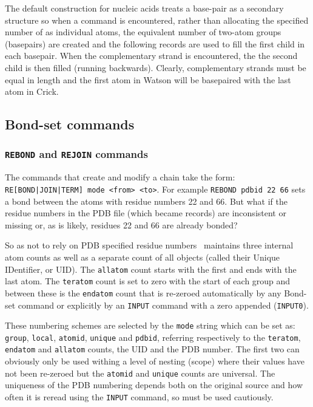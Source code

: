 The default construction for nucleic acids treats a base-pair as a secondary structure so when
a  command is encountered, rather than allocating the specified number of 
as individual atoms, the equivalent number of two-atom groups (basepairs) are created and the
following  records are used to fill the first child in each basepair.   When the 
complementary strand is encountered, the the second child is then filled (running backwards).
Clearly, complementary strands must be equal in length and the first atom in Watson will be
basepaired with the last atom in Crick. 


\subsection{Bond-set commands}

\subsubsection{{\tt REBOND} and {\tt REJOIN} commands}

The commands that create and modify a chain take the form: {\tt RE[BOND|JOIN|TERM] mode <from> <to>}.
For example {\tt REBOND pdbid 22 66} sets a bond between the atoms with residue numbers 22 and 66.
But what if the residue numbers in the PDB file (which became  records) are inconsistent or
missing or, as is likely, residues 22 and 66 are already bonded?

So as not to rely on PDB specified residue numbers \NAME\ maintains three internal atom counts as
well as a separate count of all objects (called their Unique IDentifier, or UID).  The {\tt allatom}
count starts with the first and ends with the last atom.  The {\tt teratom} count is set to zero with the
start of each group and between these is the {\tt endatom} count that is re-zeroed automatically by
any Bond-set command or explicitly by an {\tt INPUT} command with a zero appended ({\tt INPUT0}).

These numbering schemes are selected by the {\tt mode} string which can be set as: {\tt group}, {\tt local},
{\tt atomid}, {\tt unique} and {\tt pdbid}, referring respectively to the  {\tt teratom},  {\tt endatom}
and  {\tt allatom} counts, the UID and the PDB number.   The first two can obviously only be used
withing a level of nesting (scope) where their values have not been re-zeroed but the {\tt atomid} and
{\tt unique} counts are universal.   The uniqueness of the PDB numbering depends both on the
original source and how often it is reread using the {\tt INPUT} command, so must be used cautiously.

